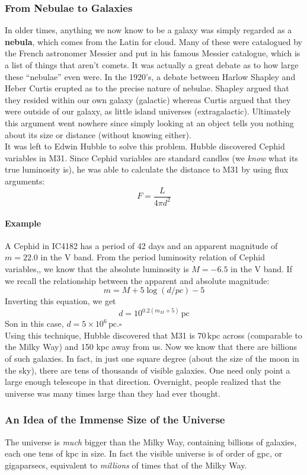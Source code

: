 \documentclass{article}
\begin{document}
	\subsubsection{From Nebulae to Galaxies}
	In older times, anything we now know to be a galaxy was simply regarded as a \textbf{nebula}, which comes from the Latin for cloud. Many of these were catalogued by the French astronomer Messier and put in his famous Messier catalogue, which is a list of things that aren't comets. It was actually a great debate as to how large these ``nebulae'' even were. In the 1920's, a debate between Harlow Shapley and Heber Curtis erupted as to the precise nature of nebulae. Shapley argued that they resided within our own galaxy (galactic) whereas Curtis argued that they were outside of our galaxy, as little island universes (extragalactic). Ultimately this argument went nowhere since simply looking at an object tells you nothing about its size or distance (without knowing either).\\
	
	\noindent It was left to Edwin Hubble to solve this problem. Hubble discovered Cephid variables in M31. Since Cephid variables are standard candles (we \emph{know} what its true luminosity is), he was able to calculate the distance to M31 by using flux arguments:
	$$F=\frac{L}{4\pi d^2}$$
	\paragraph{Example} A Cephid in IC4182 has a period of 42 days and an apparent magnitude of $m=22.0$ in the V band. From the period luminosity relation of Cephid variables,, we know that the absolute luminosity is $M=-6.5$ in the V band. If we recall the relationship between the apparent and absolute magnitude:
	$$m=M+5\log(d/pc)-5$$
	Inverting this equation, we get
	$$d=10^{0.2(m_M+5)}\,\mathrm{pc}$$
	Son in this case, $d=5\times10^6\,\mathrm{pc}$.\hfill $\square$\\
	
	\noindent Using this technique, Hubble discovered that M31 is $70\,\mathrm{kpc}$ across (comparable to the Milky Way) and 150 kpc away from us. Now we know that there are billions of such galaxies. In fact, in just one square degree (about the size of the moon in the sky), there are tens of thousands of visible galaxies. One need only point a large enough telescope in that direction. Overnight, people realized that the universe was many times large than they had ever thought.
	\subsubsection{An Idea of the Immense Size of the Universe}
	The universe is \emph{much} bigger than the Milky Way, containing billions of galaxies, each one tens of kpc in size. In fact the visible universe is of order of gpc, or gigaparsecs, equivalent to \emph{millions} of times that of the Milky Way.
\end{document}
